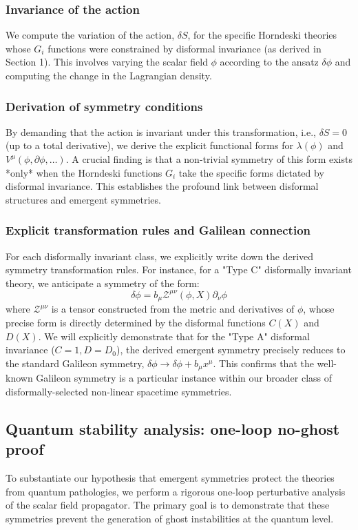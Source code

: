 \documentclass[twocolumn]{aastex631}
\begin{document}
\subsubsection{Invariance of the action}
We compute the variation of the action, $\delta S$, for the specific Horndeski theories whose $G_i$ functions were constrained by disformal invariance (as derived in Section 1). This involves varying the scalar field $\phi$ according to the ansatz $\delta\phi$ and computing the change in the Lagrangian density.

\subsubsection{Derivation of symmetry conditions}
By demanding that the action is invariant under this transformation, i.e., $\delta S = 0$ (up to a total derivative), we derive the explicit functional forms for $\lambda(\phi)$ and $V^\mu(\phi, \partial\phi, \dots)$. A crucial finding is that a non-trivial symmetry of this form exists *only* when the Horndeski functions $G_i$ take the specific forms dictated by disformal invariance. This establishes the profound link between disformal structures and emergent symmetries.

\subsubsection{Explicit transformation rules and Galilean connection}
For each disformally invariant class, we explicitly write down the derived symmetry transformation rules. For instance, for a "Type C" disformally invariant theory, we anticipate a symmetry of the form:
$$ \delta\phi = b_\mu \mathcal{Z}^{\mu\nu}(\phi, X) \partial_\nu \phi $$
where $\mathcal{Z}^{\mu\nu}$ is a tensor constructed from the metric and derivatives of $\phi$, whose precise form is directly determined by the disformal functions $C(X)$ and $D(X)$. We will explicitly demonstrate that for the "Type A" disformal invariance ($C=1, D=D_0$), the derived emergent symmetry precisely reduces to the standard Galileon symmetry, $\delta\phi \rightarrow \delta\phi + b_\mu x^\mu$. This confirms that the well-known Galileon symmetry is a particular instance within our broader class of disformally-selected non-linear spacetime symmetries.

\subsection{Quantum stability analysis: one-loop no-ghost proof}
To substantiate our hypothesis that emergent symmetries protect the theories from quantum pathologies, we perform a rigorous one-loop perturbative analysis of the scalar field propagator. The primary goal is to demonstrate that these symmetries prevent the generation of ghost instabilities at the quantum level.
\end{document}
